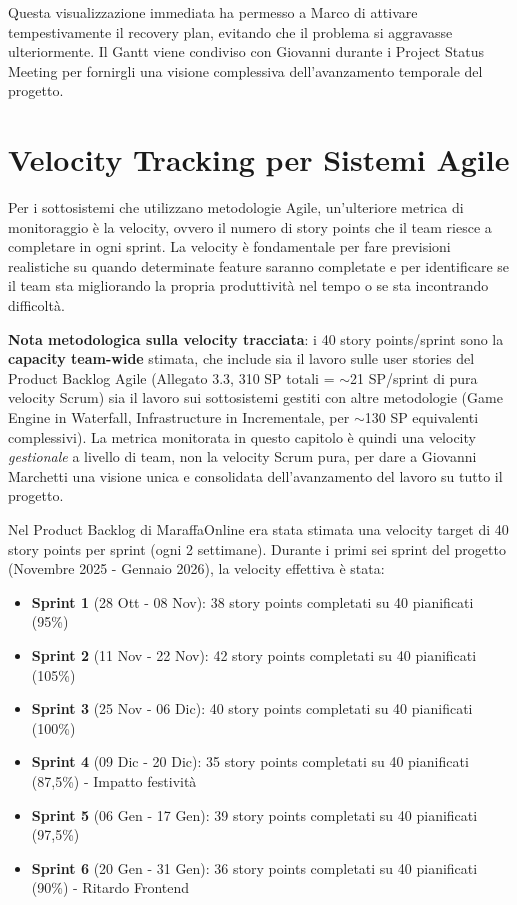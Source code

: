 Questa visualizzazione immediata ha permesso a Marco di attivare tempestivamente il recovery plan, evitando che il problema si aggravasse ulteriormente. Il Gantt viene condiviso con Giovanni durante i Project Status Meeting per fornirgli una visione complessiva dell'avanzamento temporale del progetto.

\section{Velocity Tracking per Sistemi Agile}

Per i sottosistemi che utilizzano metodologie Agile, un'ulteriore metrica di monitoraggio è la velocity, ovvero il numero di story points che il team riesce a completare in ogni sprint. La velocity è fondamentale per fare previsioni realistiche su quando determinate feature saranno completate e per identificare se il team sta migliorando la propria produttività nel tempo o se sta incontrando difficoltà.

\textbf{Nota metodologica sulla velocity tracciata}: i 40 story points/sprint sono la \textbf{capacity team-wide} stimata, che include sia il lavoro sulle user stories del Product Backlog Agile (Allegato 3.3, 310 SP totali = $\sim$21 SP/sprint di pura velocity Scrum) sia il lavoro sui sottosistemi gestiti con altre metodologie (Game Engine in Waterfall, Infrastructure in Incrementale, per $\sim$130 SP equivalenti complessivi). La metrica monitorata in questo capitolo è quindi una velocity \textit{gestionale} a livello di team, non la velocity Scrum pura, per dare a Giovanni Marchetti una visione unica e consolidata dell'avanzamento del lavoro su tutto il progetto.

Nel Product Backlog di MaraffaOnline era stata stimata una velocity target di 40 story points per sprint (ogni 2 settimane). Durante i primi sei sprint del progetto (Novembre 2025 - Gennaio 2026), la velocity effettiva è stata:

\begin{itemize}
    \item \textbf{Sprint 1} (28 Ott - 08 Nov): 38 story points completati su 40 pianificati (95\%)
    \item \textbf{Sprint 2} (11 Nov - 22 Nov): 42 story points completati su 40 pianificati (105\%)
    \item \textbf{Sprint 3} (25 Nov - 06 Dic): 40 story points completati su 40 pianificati (100\%)
    \item \textbf{Sprint 4} (09 Dic - 20 Dic): 35 story points completati su 40 pianificati (87,5\%) - Impatto festività
    \item \textbf{Sprint 5} (06 Gen - 17 Gen): 39 story points completati su 40 pianificati (97,5\%)
    \item \textbf{Sprint 6} (20 Gen - 31 Gen): 36 story points completati su 40 pianificati (90\%) - Ritardo Frontend
\end{itemize}

